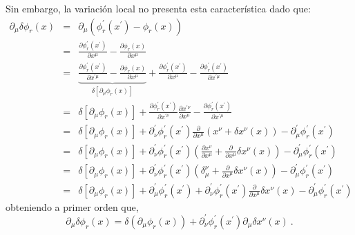 \noindent
Sin embargo, la variación local no presenta esta característica dado que:
\begin{eqnarray*}
\partial _{\mu }\delta \phi _{r}\left( x\right)  &=&\partial _{\mu }\left(\phi _{r}^{\prime }\left( x^{\prime }\right) -\phi _{r}\left( x\right) \right)  \\
&=&\frac{\partial \phi _{r}^{\prime }\left( x^{\prime }\right) }{\partial x^{\mu }}-\frac{\partial \phi _{r}\left( x\right) }{\partial x^{\mu }} \\
&=&\underset{\delta \left[ \partial _{\mu }\phi _{r}\left( x\right) \right] }{\underbrace{\frac{\partial \phi _{r}^{\prime }\left( x^{\prime }\right) }{\partial x^{\prime \mu }}-\frac{\partial \phi _{r}\left( x\right) }{\partial x^{\mu }}}}+\frac{\partial \phi _{r}^{\prime }\left( x^{\prime }\right) }{\partial x^{\mu }}-\frac{\partial \phi _{r}^{\prime }\left( x^{\prime }\right) }{\partial x^{\prime \mu }} \\
&=&\delta \left[ \partial _{\mu }\phi _{r}\left( x\right) \right] +\frac{\partial \phi _{r}^{\prime }\left( x^{\prime }\right) }{\partial x^{\prime \nu }}\frac{\partial x^{\prime \nu }}{\partial x^{\mu }}-\frac{\partial \phi_{r}^{\prime }\left( x^{\prime }\right) }{\partial x^{\prime \mu }} \\
&=&\delta \left[ \partial _{\mu }\phi _{r}\left( x\right) \right] +\partial_{\nu }^{\prime }\phi _{r}^{\prime }\left( x^{\prime }\right) \frac{\partial }{\partial x^{\mu }}\left( x^{\nu }+\delta x^{\nu }\left( x\right) \right) -\partial _{\mu }^{\prime}\phi _{r}^{\prime }\left( x^{\prime }\right)  \\
&=&\delta \left[ \partial _{\mu }\phi _{r}\left( x\right) \right] +\partial_{\nu }^{\prime }\phi _{r}^{\prime }\left( x^{\prime }\right) \left( \frac{\partial x^{\nu }}{\partial x^{\mu }}+\frac{\partial }{\partial x^{\mu }} \delta x^{\nu }\left( x\right) \right) -\partial _{\mu }^{\prime}\phi _{r}^{\prime }\left( x^{\prime }\right)  \\
&=&\delta \left[ \partial _{\mu }\phi _{r}\left( x\right) \right] +\partial_{\nu }^{\prime }\phi _{r}^{\prime }\left( x^{\prime }\right) \left( \delta_{\mu }^{\nu }+\frac{\partial }{\partial x^{\mu }}\delta x^{\nu }\left(x\right) \right) -\partial _{\mu }^{\prime }\phi _{r}^{\prime }\left(x^{\prime }\right)  \\
&=&\delta \left[ \partial _{\mu }\phi _{r}\left( x\right) \right] +\partial_{\mu }^{\prime }\phi _{r}^{\prime }\left( x^{\prime }\right) +\partial_{\nu }^{\prime }\phi _{r}^{\prime }\left( x^{\prime }\right) \frac{\partial }{\partial x^{\mu }}\delta x^{\nu }\left( x\right) -\partial _{\mu }^{\prime}\phi _{r}^{\prime }\left( x^{\prime }\right) 
\end{eqnarray*}
obteniendo a primer orden que,
\begin{equation}
\partial _{\mu }\delta \phi _{r}\left( x\right) =\delta \left(\partial _{\mu }\phi _{r}\left( x\right) \right) +\partial _{\nu }^{\prime}\phi _{r}^{\prime }\left( x^{\prime }\right) \partial_{\mu}\delta x^{\nu }\left( x\right) ~.
\label{eq2.39}
\end{equation}

